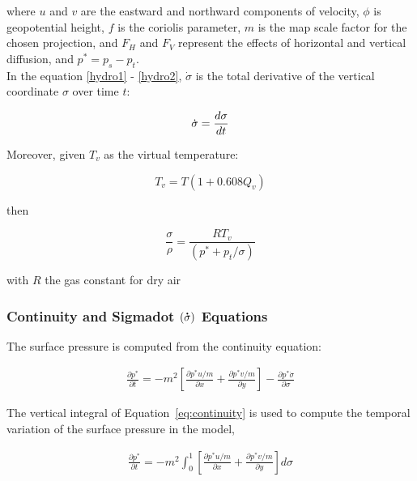 where $u$ and $v$ are the eastward and northward components of
velocity, $\phi$ is geopotential height, $f$ is the coriolis parameter,
$m$ is the map scale factor for the chosen projection, and $F_H$ and $F_V$
represent the effects of horizontal and vertical diffusion, and
$p^{\ast} = p_s-p_t$.  \\

In the equation \ref{hydro1} - \ref{hydro2}, $\dot{\sigma}$ is the total
derivative of the vertical coordinate $\sigma$ over time $t$:

\begin{equation}
\dot{\sigma} = {d\sigma \over dt}
\end{equation}

Moreover, given $T_v$ as the virtual temperature:

\begin{equation}
T_v = T \left( 1 + 0.608 Q_v \right)
\end{equation}

then

\begin{equation}
\frac{\sigma}{\rho} = \frac{RT_v}{(p^{\ast} + p_t/\sigma)}
\end{equation}

with $R$ the gas constant for dry air

\subsubsection{Continuity and Sigmadot $({\bf \dot{\sigma}})$ Equations}

The surface pressure is computed from the continuity equation:

\begin{eqnarray} \label{eq:continuity}
\frac{\partial{p^{\ast}}}{\partial{t}} = 
	-m^2 \left[ \frac{\partial{p^{\ast}u/m}}{\partial{x}} +
		    \frac{\partial{p^{\ast}v/m}}{\partial{y}} \right] -
	\frac{\partial{p^{\ast}\dot{\sigma}}}{\partial{\sigma}}
\end{eqnarray}

The vertical integral of Equation~\ref{eq:continuity} is used to
compute the temporal variation of the surface pressure in the model,

\begin{eqnarray}
\label{intform}
	\frac{\partial{p^{\ast}}}{\partial{t}} = -m^2 \int_{0}^{1}
	{\left[ \frac{\partial{p^{\ast}u/m}}{\partial{x}} + 
		\frac{\partial{p^{\ast}v/m}}{\partial{y}} \right] d\sigma}
\end{eqnarray}

